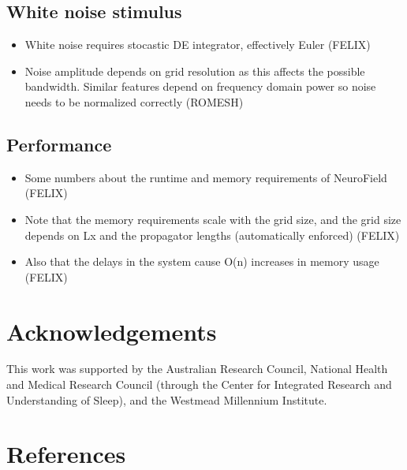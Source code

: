 \documentclass[preprint,review,10pt,authoryear,letterpaper]{elsarticle}
\begin{document}
\subsection{White noise stimulus}
\begin{itemize}
	\item White noise requires stocastic DE integrator, effectively Euler (FELIX)
	\item Noise amplitude depends on grid resolution as this affects the possible bandwidth. Similar features depend on frequency domain power so noise needs to be normalized correctly (ROMESH)
\end{itemize}

\subsection{Performance}

\begin{itemize}
\item Some numbers about the runtime and memory requirements of NeuroField (FELIX)
\item Note that the memory requirements scale with the grid size, and the grid size depends on Lx and the propagator lengths (automatically enforced) (FELIX)
\item Also that the delays in the system cause O(n) increases in memory usage (FELIX)
\end{itemize}


\section{Acknowledgements}
\label{sec:acknowledgements}
This work was supported by the Australian Research Council, National Health and Medical Research Council (through the Center for Integrated Research and Understanding of Sleep), and the Westmead Millennium Institute.

\section{References}


\end{document}
